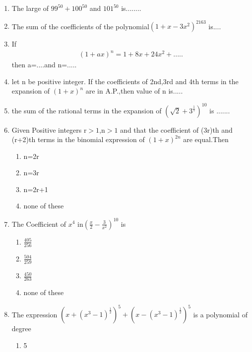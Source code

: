%
%
%
\renewcommand{\theequation}{\theenumi}
\begin{enumerate}[label=\arabic*.,ref=\thesubsection.\theenumi]

\item The large of $99^{50}+100^{50}$ and $101^{50}$ is........
\item The sum of the coefficients of the polynomial$(1+x-3x^2)^{2163}$ is....
\item If
\begin{align}
(1+ax)^n=1+8x+24x^2+.....
\end{align} then a=....and n=.....\\
\item let n be positive integer. If the coefficients of 2nd,3rd and 4th terms in the expansion of $(1+x)^n$ are in A.P.,then value of n is.....
\item the sum of the rational terms in the expansion of  $(\sqrt{2}+3^\frac{1}{5})^{10}$ is .......
\item Given Positive integers r$>1$,n$>1$ and that the coefficient of (3r)th and (r+2)th terms in the binomial expression of $(1+x)^{2n}$ are equal.Then
\begin{enumerate}
\item n=2r

\item n=3r

\item n=2r+1

\item none of these
\end{enumerate}

\item The Coefficient of $x^4$ in$ (\frac{x}{2}-\frac{3}{x^2})^{10} $ is
\begin{enumerate}
\item $\frac{405}{256}$

\item $\frac{504}{259}$

\item $\frac{450}{263}$

\item none of these
\end{enumerate}

\item The expression $(x+(x^3-1)^\frac{1}{2})^5+(x-(x^3-1)^\frac{1}{2})^5$ is a polynomial of degree 
\begin{enumerate}
\item 5


\end{enumerate}
\end{enumerate}
